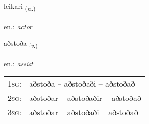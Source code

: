 \documentclass[frontgrid, backgrid]{flacards}\usepackage[]{graphicx}\usepackage[]{xcolor}
\begin{document}
\renewcommand{\flhead}{\vskip5pt \fboxsep=0pt {\small\bfseries\footnotesize Nafnorð | Noun}}
\renewcommand{\fcfoot}{\vskip5pt \fboxsep=0pt \hspace{2pt}{\small\bfseries\footnotesize 2K}}

\renewcommand{\blhead}{\vskip5pt {\small\bfseries\footnotesize Nafnorð | Noun }}
\renewcommand{\bcfoot}{\vskip5pt \hspace{2pt}{\small\bfseries\footnotesize 2K}}


{leikari \small{\textsubscript{(\textit{m.})}} \\[1ex] %
\textphonetic{[leiːkarɪ]} \\
en.: \emph{actor} \\  [2ex]
\renewcommand*{\arraystretch}{0.8}
}

\renewcommand{\flhead}{\vskip5pt \fboxsep=0pt {\small\bfseries\footnotesize Sagnorð | Verb}}
\renewcommand{\fcfoot}{\vskip5pt \fboxsep=0pt \hspace{2pt}{\small\bfseries\footnotesize 2K}}

\renewcommand{\blhead}{\vskip5pt {\small\bfseries\footnotesize Sagnorð | Verb }}
\renewcommand{\bcfoot}{\vskip5pt \hspace{2pt}{\small\bfseries\footnotesize 2K}}


{aðstoða \small{\textsubscript{(\textit{v.})}} \\[1ex] %
\textphonetic{[aðstɔða]} \\
en.: \emph{assist} \\  [2ex]
\renewcommand*{\arraystretch}{0.8}
\begin{tabular}{p{1cm}l}
\textsc{1sg}: & aðstoða -- aðstoðaði -- aðstoðað \\ 
\textsc{2sg}: & aðstoðar -- aðstoðaðir -- aðstoðað \\ 
\textsc{3sg}: & aðstoðar -- aðstoðaði -- aðstoðað \\ 
\end{tabular}
}
\end{document}
